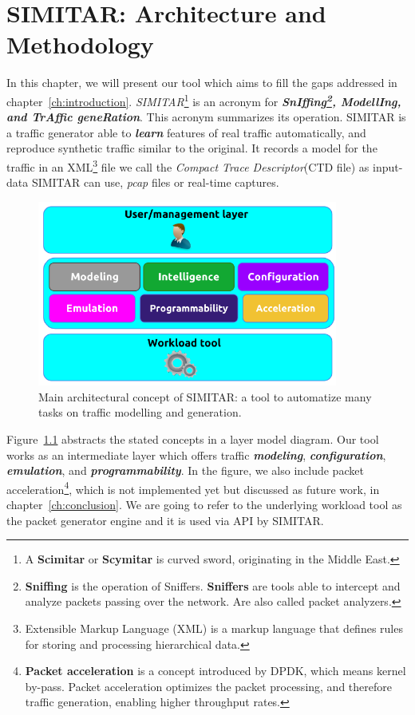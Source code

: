 \chapter{SIMITAR: Architecture and Methodology}\label{ch:architecture}

In this chapter, we will present our tool which aims to fill the gaps addressed in chapter~\ref{ch:introduction}. \textit{SIMITAR}\footnote{A \textbf{Scimitar} or \textbf{Scymitar} is curved sword, originating in the Middle East\cite{scymitar-sword}.} is an acronym for \textbf{\textit{SnIffing\footnote{\textbf{Sniffing} is the operation of Sniffers. \textbf{Sniffers} are tools able to intercept and analyze packets passing over the network. Are also called packet analyzers\cite{libpcap-tuto}.}, ModellIng, and TrAffic geneRation}}. This acronym summarizes its operation.
SIMITAR is a traffic generator able to \textbf{\textit{learn}} features of real traffic automatically, and reproduce synthetic traffic similar to the original. It records a model for the traffic in an \acrshort{XML}\footnote{Extensible Markup Language (XML) is a markup language that defines rules for storing and processing hierarchical data\cite{web-xml}.} file we call the \textit{Compact Trace Descriptor}(CTD file) as input-data SIMITAR can use, \textit{pcap} files or real-time captures. 

\begin{figure}[ht!]
    \centering
    \includegraphics[height=2.4in]{figures/ch1/layer-diagram}
    \caption{Main architectural concept of SIMITAR: a tool to automatize many tasks on traffic modelling and generation.}
    \label{fig:layer-diagram}
\end{figure}

Figure~\ref{fig:layer-diagram} abstracts the  stated concepts in a layer model diagram. Our tool works as an intermediate layer which offers traffic \textbf{\textit{modeling}}, \textbf{\textit{configuration}}, \textbf{\textit{emulation}}, and \textbf{\textit{programmability}}. In the figure, we also include packet acceleration\footnote{\textbf{Packet acceleration} is a concept introduced by DPDK\cite{web-dpdk}, which means kernel by-pass. Packet acceleration optimizes the packet processing, and therefore traffic generation, enabling higher throughput rates.}, which is not implemented yet but discussed as future work, in chapter~\ref{ch:conclusion}.  We are going to refer to the underlying workload tool as the packet generator engine and it is used via API by SIMITAR. 

